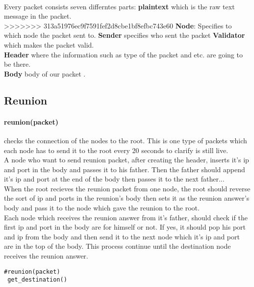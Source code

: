 \documentclass{article}
\begin{document}
\paragraph{}Every packet consists seven differntes parts: \textbf{plain\underline{\hspace{.05in}}text} which is the raw text message in the packet.\\
>>>>>>> 313a51976ec9f7591fef2d8cbe1bf8efbc743e60
\textbf{Node}: Specifies to which node the packet sent to. \textbf{Sender} specifies who sent the packet \textbf{Validator} which makes the packet valid.\\ \textbf{Header} where the information such as type of the packet and etc. are going to be there.\\ \textbf{Body} body of our packet .
\subsection{Reunion}
\paragraph{reunion(packet)} checks the connection of the nodes to the root. This is one type of packets which each node has to send it to the root every 20 seconds to clarify is still live. \\
A node who want to send reunion packet, after creating the header, inserts it's ip and port in the body and passes it to his father. Then the father should append it's ip and port at the end of the body then passes it to the next father... \\
When the root recieves the reunion packet from one node, the root should reverse the sort of ip and ports in the reunion's body then sets it as the reunion answer's body and pass it to the node which gave the reunion to the root. \\
Each node which receives the reunion answer from it's father, should check if the first ip and port in the body are for himself or not. If yes, it should pop his port and ip from the body and then send it to the next node which it's ip and port are in the top of the body.
This process continue until the destination node receives the reunion answer.
\begin{lstlisting}
#reunion(packet)
 get_destination()
\end{lstlisting}
\end{document}
